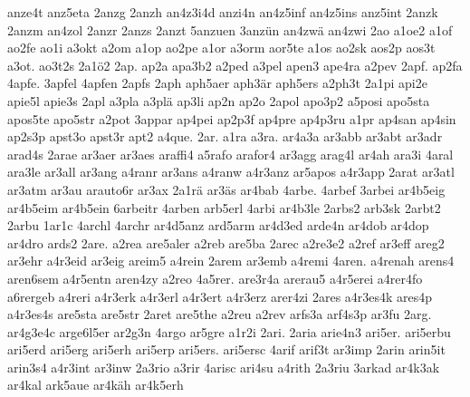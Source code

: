 {    anze4t
    anz5eta
    2anzg
    2anzh
    an4z3i4d
    anzi4n
    an4z5inf
    an4z5ins
    anz5int
    2anzk
    2anzm
    an4zol
    2anzr
    2anzs
    2anzt
    5anzuen
    3anzün
    an4zwä
    an4zwi
    2ao
    a1oe2
    a1of
    ao2fe
    ao1i
    a3okt
    a2om
    a1op
    ao2pe
    a1or
    a3orm
    aor5te
    a1os
    ao2sk
    aos2p
    aos3t
    a3ot.
    ao3t2s
    2a1ö2
    2ap.
    ap2a
    apa3b2
    a2ped
    a3pel
    apen3
    ape4ra
    a2pev
    2apf.
    ap2fa
    4apfe.
    3apfel
    4apfen
    2apfs
    2aph
    aph5aer
    aph3är
    aph5ers
    a2ph3t
    2a1pi
    api2e
    apie5l
    apie3s
    2apl
    a3pla
    a3plä
    ap3li
    ap2n
    ap2o
    2apol
    apo3p2
    a5posi
    apo5sta
    apos5te
    apo5str
    a2pot
    3appar
    ap4pei
    ap2p3f
    ap4pre
    ap4p3ru
    a1pr
    ap4san
    ap4sin
    ap2s3p
    apst3o
    apst3r
    apt2
    a4que.
    2ar.
    a1ra
    a3ra.
    ar4a3a
    ar3abb
    ar3abt
    ar3adr
    arad4s
    2arae
    ar3aer
    ar3aes
    araffi4
    a5rafo
    arafor4
    ar3agg
    arag4l
    ar4ah
    ara3i
    4aral
    ara3le
    ar3all
    ar3ang
    a4ranr
    ar3ans
    a4ranw
    a4r3anz
    ar5apos
    a4r3app
    2arat
    ar3atl
    ar3atm
    ar3au
    arauto6r
    ar3ax
    2a1rä
    ar3äs
    ar4bab
    4arbe.
    4arbef
    3arbei
    ar4b5eig
    ar4b5eim
    ar4b5ein
    6arbeitr
    4arben
    arb5erl
    4arbi
    ar4b3le
    2arbs2
    arb3sk
    2arbt2
    2arbu
    1ar1c
    4archl
    4archr
    ar4d5anz
    ard5arm
    ar4d3ed
    arde4n
    ar4dob
    ar4dop
    ar4dro
    ards2
    2are.
    a2rea
    are5aler
    a2reb
    are5ba
    2arec
    a2re3e2
    a2ref
    ar3eff
    areg2
    ar3ehr
    a4r3eid
    ar3eig
    areim5
    a4rein
    2arem
    ar3emb
    a4remi
    4aren.
    a4renah
    arens4
    aren6sem
    a4r5entn
    aren4zy
    a2reo
    4a5rer.
    are3r4a
    arerau5
    a4r5erei
    a4rer4fo
    a6rergeb
    a4reri
    a4r3erk
    a4r3erl
    a4r3ert
    a4r3erz
    arer4zi
    2ares
    a4r3es4k
    ares4p
    a4r3es4s
    are5sta
    are5str
    2aret
    are5the
    a2reu
    a2rev
    arfs3a
    arf4s3p
    ar3fu
    2arg.
    ar4g3e4c
    arge6l5er
    ar2g3n
    4argo
    ar5gre
    a1r2i
    2ari.
    2aria
    arie4n3
    ari5er.
    ari5erbu
    ari5erd
    ari5erg
    ari5erh
    ari5erp
    ari5ers.
    ari5ersc
    4arif
    arif3t
    ar3imp
    2arin
    arin5it
    arin3s4
    a4r3int
    ar3inw
    2a3rio
    a3rir
    4arisc
    ari4su
    a4rith
    2a3riu
    3arkad
    ar4k3ak
    ar4kal
    ark5aue
    ar4käh
    ar4k5erh
}
